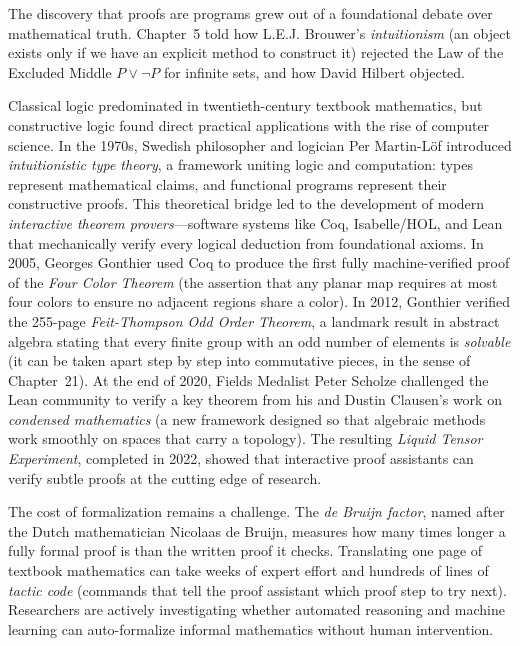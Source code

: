 \begin{historybox}
The discovery that proofs are programs grew out of a foundational debate over mathematical truth. Chapter~5 told how L.E.J. Brouwer's \emph{intuitionism} (an object exists only if we have an explicit method to construct it) rejected the Law of the Excluded Middle $P \lor \neg P$ for infinite sets, and how David Hilbert objected.

Classical logic predominated in twentieth-century textbook mathematics, but constructive logic found direct practical applications with the rise of computer science. In the 1970s, Swedish philosopher and logician Per Martin-L\"of introduced \emph{intuitionistic type theory}, a framework uniting logic and computation: types represent mathematical claims, and functional programs represent their constructive proofs. This theoretical bridge led to the development of modern \emph{interactive theorem provers}---software systems like Coq, Isabelle/HOL, and Lean that mechanically verify every logical deduction from foundational axioms. In 2005, Georges Gonthier used Coq to produce the first fully machine-verified proof of the \emph{Four Color Theorem} (the assertion that any planar map requires at most four colors to ensure no adjacent regions share a color). In 2012, Gonthier verified the 255-page \emph{Feit-Thompson Odd Order Theorem}, a landmark result in abstract algebra stating that every finite group with an odd number of elements is \emph{solvable} (it can be taken apart step by step into commutative pieces, in the sense of Chapter~21). At the end of 2020, Fields Medalist Peter Scholze challenged the Lean community to verify a key theorem from his and Dustin Clausen's work on \emph{condensed mathematics} (a new framework designed so that algebraic methods work smoothly on spaces that carry a topology). The resulting \emph{Liquid Tensor Experiment}, completed in 2022, showed that interactive proof assistants can verify subtle proofs at the cutting edge of research.

The cost of formalization remains a challenge. The \emph{de Bruijn factor}, named after the Dutch mathematician Nicolaas de Bruijn, measures how many times longer a fully formal proof is than the written proof it checks. Translating one page of textbook mathematics can take weeks of expert effort and hundreds of lines of \emph{tactic code} (commands that tell the proof assistant which proof step to try next). Researchers are actively investigating whether automated reasoning and machine learning can auto-formalize informal mathematics without human intervention.
\end{historybox}


